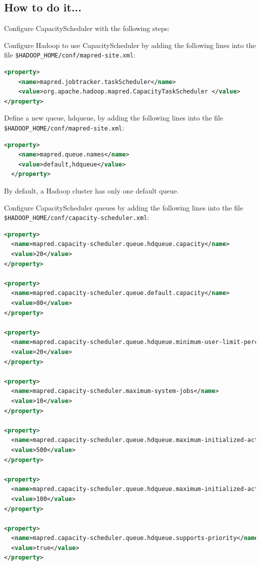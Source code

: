 \subsection*{How to do it...}
Configure CapacityScheduler with the following steps: 

Configure Hadoop to use CapacityScheduler by adding the following lines into the file \verb|$HADOOP_HOME/conf/mapred-site.xml|:
\lstset{style=bashstyle}
\begin{lstlisting}[language=XML]
<property>
    <name>mapred.jobtracker.taskScheduler</name>
    <value>org.apache.hadoop.mapred.CapacityTaskScheduler </value>
</property>
\end{lstlisting}

Define a new queue, hdqueue, by adding the following lines into the file \verb|$HADOOP_HOME/conf/mapred-site.xml|:
\lstset{style=bashstyle}
\begin{lstlisting}[language=XML]
<property>
    <name>mapred.queue.names</name>
    <value>default,hdqueue</value>
  </property>
\end{lstlisting}

\begin{info}
By default, a Hadoop cluster has only one default queue.
\end{info}
Configure CapacityScheduler queues by adding the following lines into the file \verb|$HADOOP_HOME/conf/capacity-scheduler.xml|:
\lstset{style=bashstyle}
\begin{lstlisting}[language=XML]
<property>
  <name>mapred.capacity-scheduler.queue.hdqueue.capacity</name>
  <value>20</value>
</property>

<property>
  <name>mapred.capacity-scheduler.queue.default.capacity</name>
  <value>80</value>
</property>

<property>
  <name>mapred.capacity-scheduler.queue.hdqueue.minimum-user-limit-percent</name>
  <value>20</value>
</property>

<property>
  <name>mapred.capacity-scheduler.maximum-system-jobs</name>
  <value>10</value>
</property>

<property>
  <name>mapred.capacity-scheduler.queue.hdqueue.maximum-initialized-active-tasks</name>
  <value>500</value>
</property>

<property>
  <name>mapred.capacity-scheduler.queue.hdqueue.maximum-initialized-active-tasks-per-user</name>
  <value>100</value>
</property>

<property>
  <name>mapred.capacity-scheduler.queue.hdqueue.supports-priority</name>
  <value>true</value>
</property>
\end{lstlisting}

